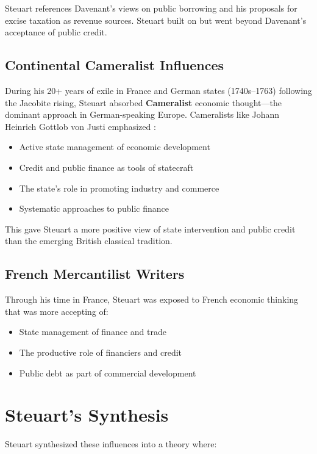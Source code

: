\documentclass[12pt]{article}
\begin{document}
Steuart references Davenant's views on public borrowing and his proposals for excise taxation as revenue sources. Steuart built on but went beyond Davenant's acceptance of public credit.

\subsection{Continental Cameralist Influences}

During his 20+ years of exile in France and German states (1740s--1763) following the Jacobite rising, Steuart absorbed \textbf{Cameralist} economic thought—the dominant approach in German-speaking Europe. Cameralists like Johann Heinrich Gottlob von Justi emphasized \citep{tribe1993, rossner2016}:

\begin{itemize}
\item Active state management of economic development
\item Credit and public finance as tools of statecraft
\item The state's role in promoting industry and commerce
\item Systematic approaches to public finance
\end{itemize}

This gave Steuart a more positive view of state intervention and public credit than the emerging British classical tradition.

\subsection{French Mercantilist Writers}

Through his time in France, Steuart was exposed to French economic thinking that was more accepting of:

\begin{itemize}
\item State management of finance and trade
\item The productive role of financiers and credit
\item Public debt as part of commercial development
\end{itemize}

\section{Steuart's Synthesis}

Steuart synthesized these influences into a theory where:
\end{document}
